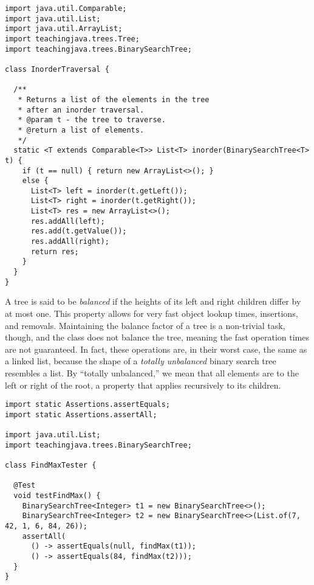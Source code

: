 \enlargethispage{1\baselineskip}
\begin{lstlisting}[language=MyJava]
import java.util.Comparable;
import java.util.List;
import java.util.ArrayList;
import teachingjava.trees.Tree;
import teachingjava.trees.BinarySearchTree;

class InorderTraversal {

  /**
   * Returns a list of the elements in the tree 
   * after an inorder traversal.
   * @param t - the tree to traverse.
   * @return a list of elements.
   */
  static <T extends Comparable<T>> List<T> inorder(BinarySearchTree<T> t) {
    if (t == null) { return new ArrayList<>(); } 
    else {
      List<T> left = inorder(t.getLeft());
      List<T> right = inorder(t.getRight());
      List<T> res = new ArrayList<>();
      res.addAll(left);
      res.add(t.getValue());
      res.addAll(right);
      return res;
    }
  }
}
\end{lstlisting}

A tree is said to be \emph{balanced} if the heights of its left and right children differ by at most one.
This property allows for very fast object lookup times, insertions, and removals. 
Maintaining the balance factor of a tree is a non-trivial task, though, and the  class does not balance the tree, meaning the fast operation times are not guaranteed.
In fact, these operations are, in their worst case, the same as a linked list, because the shape of a \emph{totally unbalanced} binary search tree resembles a list. 
By ``totally unbalanced,'' we mean that all elements are to the left or right of the root, a property that applies recursively to its children.


\begin{lstlisting}[language=MyJava]
import static Assertions.assertEquals;
import static Assertions.assertAll;

import java.util.List;
import teachingjava.trees.BinarySearchTree;

class FindMaxTester {

  @Test
  void testFindMax() {
    BinarySearchTree<Integer> t1 = new BinarySearchTree<>();
    BinarySearchTree<Integer> t2 = new BinarySearchTree<>(List.of(7, 42, 1, 6, 84, 26));
    assertAll(
      () -> assertEquals(null, findMax(t1));
      () -> assertEquals(84, findMax(t2)));
  }
}
\end{lstlisting}

